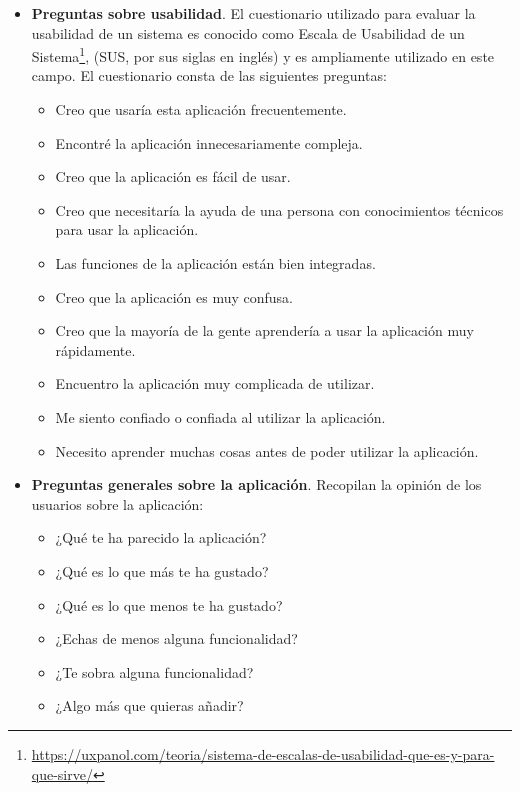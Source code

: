 \begin{itemize}
\begin{itemize}
          \end{itemize}
    \item \textbf{Preguntas sobre usabilidad}. El cuestionario utilizado para evaluar la usabilidad de un sistema es conocido como Escala de Usabilidad de un Sistema\footnote{\url{https://uxpanol.com/teoria/sistema-de-escalas-de-usabilidad-que-es-y-para-que-sirve/}}, (SUS, por sus siglas en inglés) y es ampliamente utilizado en este campo. El cuestionario consta de las siguientes preguntas:
          \begin{itemize}
              \item Creo que usaría esta aplicación frecuentemente.
              \item Encontré la aplicación innecesariamente compleja.
              \item Creo que la aplicación es fácil de usar.
              \item Creo que necesitaría la ayuda de una persona con conocimientos técnicos para usar la aplicación.
              \item Las funciones de la aplicación están bien integradas.
              \item Creo que la aplicación es muy confusa.
              \item Creo que la mayoría de la gente aprendería a usar la aplicación muy rápidamente.
              \item Encuentro la aplicación muy complicada de utilizar.
              \item Me siento confiado o confiada al utilizar la aplicación.
              \item Necesito aprender muchas cosas antes de poder utilizar la aplicación.
          \end{itemize}
    \item \textbf{Preguntas generales sobre la aplicación}. Recopilan la opinión de los usuarios sobre la aplicación:
          \begin{itemize}
              \item ¿Qué te ha parecido la aplicación?
              \item ¿Qué es lo que más te ha gustado?
              \item ¿Qué es lo que menos te ha gustado?
              \item ¿Echas de menos alguna funcionalidad?
              \item ¿Te sobra alguna funcionalidad?
              \item ¿Algo más que quieras añadir?
          \end{itemize}
\end{itemize}


